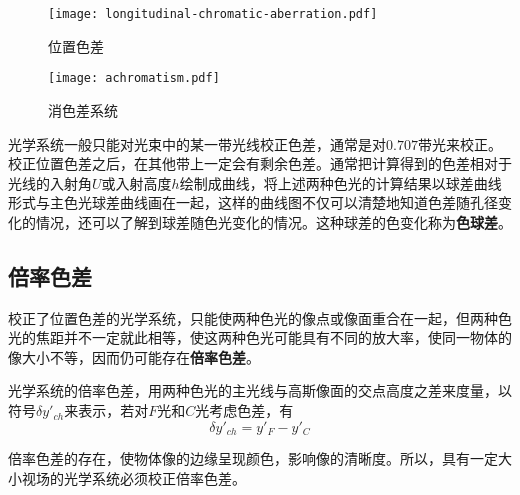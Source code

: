 \begin{figure}[htbp]
	\centering
	\begin{minipage}[t]{0.45\textwidth}
		\centering
		\texttt{[image: longitudinal-chromatic-aberration.pdf]}
		\caption{位置色差}
		\label{fig:longitudinal-chromatic-aberration}
	\end{minipage}
	\quad
	\begin{minipage}[t]{0.45\textwidth}
		\centering
		\texttt{[image: achromatism.pdf]}
		\caption{消色差系统}
		\label{fig:achromatism}
	\end{minipage}
\end{figure}

光学系统一般只能对光束中的某一带光线校正色差，通常是对$0.707$带光来校正。校正位置色差之后，在其他带上一定会有剩余色差。通常把计算得到的色差相对于光线的入射角$U$或入射高度$h$绘制成曲线，将上述两种色光的计算结果以球差曲线形式与主色光球差曲线画在一起，这样的曲线图不仅可以清楚地知道色差随孔径变化的情况，还可以了解到球差随色光变化的情况。这种球差的色变化称为\textbf{色球差}。

\subsection{倍率色差}
校正了位置色差的光学系统，只能使两种色光的像点或像面重合在一起，但两种色光的焦距并不一定就此相等，使这两种色光可能具有不同的放大率，使同一物体的像大小不等，因而仍可能存在\textbf{倍率色差}。

光学系统的倍率色差，用两种色光的主光线与高斯像面的交点高度之差来度量，以符号$\delta y'_{ch}$来表示，若对$F$光和$C$光考虑色差，有
\begin{equation}
\delta y'_{ch}=y'_F-y'_C
\end{equation}

倍率色差的存在，使物体像的边缘呈现颜色，影响像的清晰度。所以，具有一定大小视场的光学系统必须校正倍率色差。